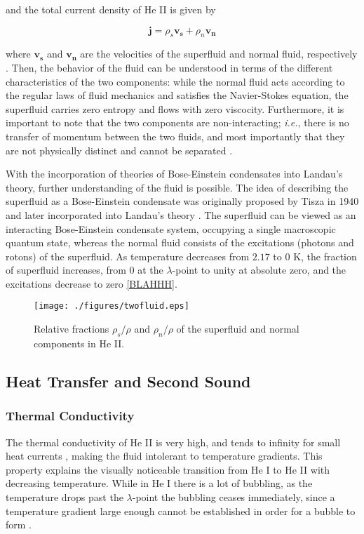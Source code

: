 and the total current density of He II is given by

\begin{equation}
\mathbf{j} = \rho_s\mathbf{v_s} + \rho_n\mathbf{v_n}
\end{equation}

where $\mathbf{v_s}$ and $\mathbf{v_n}$ are the velocities of the
superfluid and normal fluid, respectively \cite{tilley}. Then, the
behavior of the fluid can be understood in terms of the different
characteristics of the two components: while the normal fluid acts
according to the regular laws of fluid mechanics and satisfies the
Navier-Stokes equation, the superfluid carries zero entropy and flows
with zero viscocity. Furthermore, it is important to note that the two
components are non-interacting; \emph{i.e.}, there is no transfer of
momentum between the two fluids, and most importantly that they are
not physically distinct and cannot be separated \cite{tilley}.

With the incorporation of theories of Bose-Einstein condensates into
Landau's theory, further understanding of the fluid is possible. The
idea of describing the superfluid as a Bose-Einstein condensate was
originally proposed by Tisza in 1940 and later incorporated into
Landau's theory \cite{tisza}. The superfluid can be viewed as an
interacting Bose-Einstein condensate system, occupying a single
macroscopic quantum state, whereas the normal fluid consists of the
excitations (photons and rotons) of the superfluid. As temperature
decreases from $2.17$ to $0$ K, the fraction of superfluid increases,
from $0$ at the $\lambda$-point to unity at absolute zero, and the
excitations decrease to zero \ref{BLAHHH}.


\begin{figure}[ht]
\begin{center}
\texttt{[image: ./figures/twofluid.eps]}
\caption{\small{Relative fractions $\rho_s/\rho$ and $\rho_n/\rho$ of
   the superfluid and normal components in He II.}}
\label{figure:twofluid}
\end{center}
\end{figure}



\subsection{Heat Transfer and Second Sound}

\subsubsection{Thermal Conductivity}\label{thermalconductivity}
The thermal conductivity of He II is very high, and tends to infinity
for small heat currents \cite{tilley}, making the fluid intolerant
to temperature gradients. This property explains the visually
noticeable transition from He I to He II with decreasing temperature.
While in He I there is a lot of bubbling, as the temperature drops
past the $\lambda$-point the bubbling ceases immediately, since a
temperature gradient large enough cannot be established in order for a
bubble to form \cite{tilley}.


